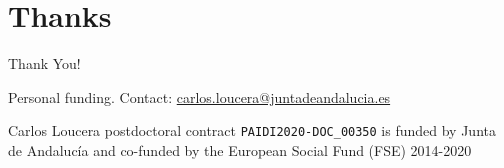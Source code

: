 \documentclass[compress,ignorenonframetext,aspectratio=1610,handout]{beamer}
\begin{document}
\section{Thanks}

	\begin{frame}{}
		\begin{center}
			{\fontsize{40}{50}\selectfont Thank You!}
		\end{center}
	\end{frame}


	\begin{frame}{Personal funding. Contact: \url{carlos.loucera@juntadeandalucia.es}}


		\vspace{0.3cm}

		Carlos Loucera postdoctoral contract \texttt{PAIDI2020-DOC\_00350} is funded by Junta de Andalucía and co-funded by the European Social Fund (FSE) 2014-2020

		\vspace{0.3cm}

		\begin{center}
		\end{center}
	\end{frame}
\end{document}

